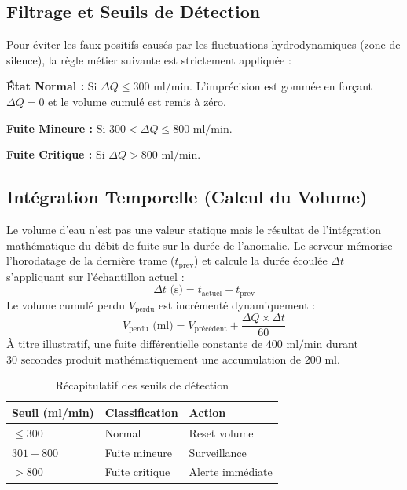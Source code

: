 \documentclass[12pt,a4paper]{article}
\begin{document}
\subsection{Filtrage et Seuils de Détection}
Pour éviter les faux positifs causés par les fluctuations hydrodynamiques (zone de silence), la règle métier suivante est strictement appliquée :

\textcolor{vertaccent}{\textbf{État Normal :}} Si $\Delta Q \le 300 \text{ ml/min}$. L'imprécision est gommée en forçant $\Delta Q = 0$ et le volume cumulé est remis à zéro.

\textcolor{bleufonce}{\textbf{Fuite Mineure :}} Si $300 < \Delta Q \le 800 \text{ ml/min}$.

\textcolor{bleuprincipal}{\textbf{Fuite Critique :}} Si $\Delta Q > 800 \text{ ml/min}$.

\subsection{Intégration Temporelle (Calcul du Volume)}
Le volume d'eau n'est pas une valeur statique mais le résultat de l'intégration mathématique du débit de fuite sur la durée de l'anomalie. Le serveur mémorise l'horodatage de la dernière trame ($t_{\text{prev}}$) et calcule la durée écoulée $\Delta t$ s'appliquant sur l'échantillon actuel :
\begin{equation}
\Delta t \text{ (s)} = t_{\text{actuel}} - t_{\text{prev}}
\end{equation}
Le volume cumulé perdu $V_{\text{perdu}}$ est incrémenté dynamiquement :
\begin{equation}
\boxed{V_{\text{perdu}} \text{ (ml)} = V_{\text{précédent}} + \frac{\Delta Q \times \Delta t}{60}}
\end{equation}
À titre illustratif, une fuite différentielle constante de $400 \text{ ml/min}$ durant $30 \text{ secondes}$ produit mathématiquement une accumulation de $200 \text{ ml}$.

\begin{table}[h]
\centering
\caption{\textcolor{bleuprincipal}{Récapitulatif des seuils de détection}}
\begin{tabular}{@{}lll@{}}
\toprule
\textbf{Seuil (ml/min)} & \textbf{Classification} & \textbf{Action} \\
\midrule
$\leq 300$ & Normal & Reset volume \\
$301 - 800$ & Fuite mineure & Surveillance \\
$> 800$ & Fuite critique & Alerte immédiate \\
\bottomrule
\end{tabular}
\end{table}
\end{document}

